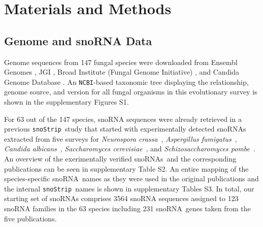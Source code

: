 \documentclass[preprint,3p,times,twocolumn]{elsarticle}
\newcommand{\JH}[1]{\begingroup\color{purple}#1\endgroup}
\newcommand{\url}[1]{\texttt{\small #1}}
\newcommand{\snos}{snoRNAs}
\newcommand{\sno}{snoRNA}
\newcommand{\cd}{box C/D snoRNA}
\newcommand{\haca}{box H/ACA snoRNA}
\newcommand{\snostrip}{\texttt{snoStrip}}
\newcommand{\ncbi}{\texttt{NCBI}}
\newcommand{\afu}{\emph{A.fumigatus}}
\newcommand{\Afu}{\emph{Aspergillus fumigatus}}
\newcommand{\Calb}{\emph{Candida albicans}}
\newcommand{\Spo}{\emph{Schizosaccharomyces pombe}}
\newcommand{\Ncr}{\emph{Neurospora crassa}}
\newcommand{\Sce}{\emph{Saccharomyces cerevisiae}}
\begin{document}

\section{Materials and Methods}

\subsection{Genome and snoRNA Data} 

Genome sequences from 147 fungal species were downloaded from Ensembl
Genomes \cite{Kersey:2016}, JGI \cite{Nordberg:2014}, Broad Institute
(Fungal Genome Initiative) , and Candida Genome Database
\cite{Skrzypek:2017}.  An \ncbi-based taxonomic tree displaying the
relationship, genome source, and version for all fungal organisms in
this evolutionary survey is shown in the supplementary Figures S1.


For 63 out of the 147 species, snoRNA sequences were already retrieved in 
a previous \snostrip\ study \cite{Bartschat:2014}
that started with experimentally detected snoRNAs extracted from five
surveys for \Ncr\ \citep{Liu:2009}, \Afu\ \citep{Joechl:2008}, \Calb\
\citep{Mitrovich:2010}, \Sce\ \citep{Piekna-Przybylska:2007}, and
\Spo\ \citep{Li:2005}. An overview of the exerimentally verified \snos\ and the
corresponding publications can be seen in supplementary Table S2.  An
entire mapping of the species-specific \sno\ names as they were used in
the original publications and the internal \snostrip\ names is shown
in supplementary Tables S3. 
In total, our starting set of snoRNAs comprises 3564
snoRNA sequences assigned to 123 snoRNA families in the 63 species including 231 \sno\ genes taken from the five publications.
\end{document}
